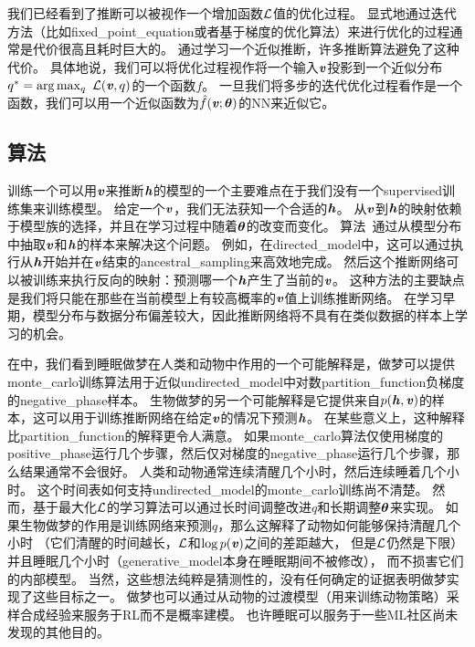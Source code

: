 \section{}
\label{sec:learned_approximate_inference}

我们已经看到了推断可以被视作一个增加函数$\mathcal{L}$值的优化过程。
显式地通过迭代方法（比如\gls{fixed_point_equation}或者基于梯度的优化算法）来进行优化的过程通常是代价很高且耗时巨大的。
通过学习一个近似推断，许多推断算法避免了这种代价。
具体地说，我们可以将优化过程视作将一个输入$\boldsymbol{\mathit{v}}$投影到一个近似分布$q^* = \arg\max_q\  \mathcal{L}(\boldsymbol{\mathit{v}},q)$的一个函数$f$。
一旦我们将多步的迭代优化过程看作是一个函数，我们可以用一个近似函数为$\hat{f}(\boldsymbol{\mathit{v}};{\boldsymbol{\theta}})$的\gls{NN}来近似它。


\subsection{算法}  
\label{sec:wake_sleep}

训练一个可以用$\boldsymbol{\mathit{v}}$来推断$\boldsymbol{\mathit{h}}$的模型的一个主要难点在于我们没有一个\gls{supervised}训练集来训练模型。
给定一个$\boldsymbol{\mathit{v}}$，我们无法获知一个合适的$\boldsymbol{\mathit{h}}$。
从$\boldsymbol{\mathit{v}}$到$\boldsymbol{\mathit{h}}$的映射依赖于模型族的选择，并且在学习过程中随着${\boldsymbol{\theta}}$的改变而变化。
算法~\citep{Hinton95,Frey96}通过从模型分布中抽取$\boldsymbol{\mathit{v}}$和$\boldsymbol{\mathit{h}}$的样本来解决这个问题。
例如，在\gls{directed_model}中，这可以通过执行从$\boldsymbol{\mathit{h}}$开始并在$\boldsymbol{\mathit{v}}$结束的\gls{ancestral_sampling}来高效地完成。
然后这个推断网络可以被训练来执行反向的映射：预测哪一个$\boldsymbol{\mathit{h}}$产生了当前的$\boldsymbol{\mathit{v}}$。
这种方法的主要缺点是我们将只能在那些在当前模型上有较高概率的$\boldsymbol{\mathit{v}}$值上训练推断网络。
在学习早期，模型分布与数据分布偏差较大，因此推断网络将不具有在类似数据的样本上学习的机会。


在中，我们看到睡眠做梦在人类和动物中作用的一个可能解释是，做梦可以提供\gls{monte_carlo}训练算法用于近似\gls{undirected_model}中对数\gls{partition_function}负梯度的\gls{negative_phase}样本。
生物做梦的另一个可能解释是它提供来自$p(\boldsymbol{\mathit{h}},\boldsymbol{\mathit{v}})$的样本，这可以用于训练推断网络在给定$\boldsymbol{\mathit{v}}$的情况下预测$\boldsymbol{\mathit{h}}$。
在某些意义上，这种解释比\gls{partition_function}的解释更令人满意。
如果\gls{monte_carlo}算法仅使用梯度的\gls{positive_phase}运行几个步骤，然后仅对梯度的\gls{negative_phase}运行几个步骤，那么结果通常不会很好。
人类和动物通常连续清醒几个小时，然后连续睡着几个小时。
这个时间表如何支持\gls{undirected_model}的\gls{monte_carlo}训练尚不清楚。
然而，基于最大化$\mathcal{L}$的学习算法可以通过长时间调整改进$q$和长期调整${\boldsymbol{\theta}}$来实现。
如果生物做梦的作用是训练网络来预测$q$，那么这解释了动物如何能够保持清醒几个小时
（它们清醒的时间越长，$\mathcal{L}$和$\log p(\boldsymbol{\mathit{v}})$之间的差距越大， 但是$\mathcal{L}$仍然是下限）
并且睡眠几个小时（\gls{generative_model}本身在睡眠期间不被修改）， 而不损害它们的内部模型。
当然，这些想法纯粹是猜测性的，没有任何确定的证据表明做梦实现了这些目标之一。
做梦也可以通过从动物的过渡模型（用来训练动物策略）采样合成经验来服务于\gls{RL}而不是概率建模。
也许睡眠可以服务于一些\gls{ML}社区尚未发现的其他目的。



